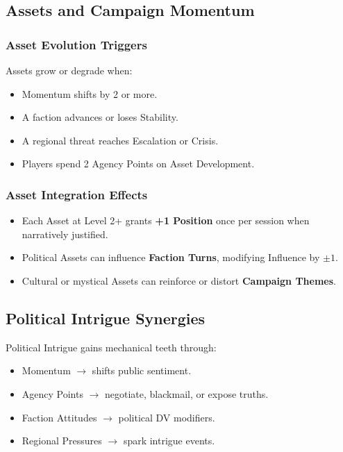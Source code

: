 \documentclass[11pt]{article}
\begin{document}
\subsection{Assets and Campaign Momentum}

\subsubsection{Asset Evolution Triggers}
Assets grow or degrade when:
\begin{itemize}
    \item Momentum shifts by 2 or more.
    \item A faction advances or loses Stability.
    \item A regional threat reaches Escalation or Crisis.
    \item Players spend 2 Agency Points on Asset Development.
\end{itemize}

\subsubsection{Asset Integration Effects}
\begin{itemize}
    \item Each Asset at Level 2+ grants \textbf{+1 Position} once per session when narratively justified.
    \item Political Assets can influence \textbf{Faction Turns}, modifying Influence by \(\pm 1\).
    \item Cultural or mystical Assets can reinforce or distort \textbf{Campaign Themes}.
\end{itemize}

\subsection{Political Intrigue Synergies}

Political Intrigue gains mechanical teeth through:
\begin{itemize}
    \item Momentum $\rightarrow$ shifts public sentiment.
    \item Agency Points $\rightarrow$ negotiate, blackmail, or expose truths.
    \item Faction Attitudes $\rightarrow$ political DV modifiers.
    \item Regional Pressures $\rightarrow$ spark intrigue events.
\end{itemize}
\end{document}
